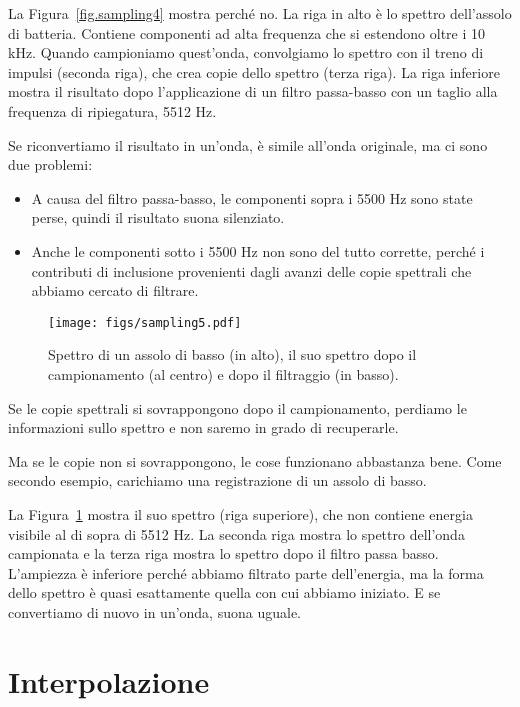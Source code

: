 \documentclass[12pt]{book} \usepackage[width=5.5in,height=8.5in, hmarginratio=3:2,vmarginratio=1:1]{geometry}
\begin{document}
La Figura~\ref{fig.sampling4} mostra perché no. La riga in alto è lo spettro dell'assolo di batteria. Contiene componenti ad alta frequenza che si estendono oltre i 10 kHz. Quando campioniamo quest'onda, convolgiamo lo spettro con il treno di impulsi (seconda riga), che crea copie dello spettro (terza riga). La riga inferiore mostra il risultato dopo l'applicazione di un filtro passa-basso con un taglio alla frequenza di ripiegatura, 5512 Hz.

Se riconvertiamo il risultato in un'onda, è simile all'onda originale, ma ci sono due problemi:

\begin{itemize} 

\item A causa del filtro passa-basso, le componenti sopra i 5500 Hz sono state perse, quindi il risultato suona silenziato.

\item Anche le componenti sotto i 5500 Hz non sono del tutto corrette, perché i contributi di inclusione provenienti dagli avanzi delle copie spettrali che abbiamo cercato di filtrare.

\end{itemize} 

\begin{figure} 

\centerline{\texttt{[image: figs/sampling5.pdf]}} \caption{Spettro di un assolo di basso (in alto), il suo spettro dopo il campionamento (al centro) e dopo il filtraggio (in basso).} \label{fig.sampling5} \end{figure} 

Se le copie spettrali si sovrappongono dopo il campionamento, perdiamo le informazioni sullo spettro e non saremo in grado di recuperarle.

Ma se le copie non si sovrappongono, le cose funzionano abbastanza bene. Come secondo esempio, carichiamo una registrazione di un assolo di basso.

La Figura~\ref{fig.sampling5} mostra il suo spettro (riga superiore), che non contiene energia visibile al di sopra di 5512 Hz. La seconda riga mostra lo spettro dell'onda campionata e la terza riga mostra lo spettro dopo il filtro passa basso. L'ampiezza è inferiore perché abbiamo filtrato parte dell'energia, ma la forma dello spettro è quasi esattamente quella con cui abbiamo iniziato. E se convertiamo di nuovo in un'onda, suona uguale.

\section{Interpolazione} 
\end{document}
